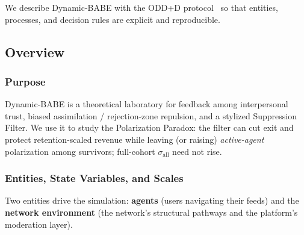 
We describe Dynamic-BABE with the ODD+D protocol~\citep{Grimm2010, Muller2013} so that entities, processes, and decision rules are explicit and reproducible.

\subsection{Overview}

\subsubsection{Purpose}
Dynamic-BABE is a theoretical laboratory for feedback among interpersonal trust, biased assimilation / rejection-zone repulsion, and a stylized Suppression Filter. We use it to study the Polarization Paradox: the filter can cut exit and protect retention-scaled revenue while leaving (or raising) \emph{active-agent} polarization among survivors; full-cohort $\sigma_{\mathrm{all}}$ need not rise.

\subsubsection{Entities, State Variables, and Scales}
Two entities drive the simulation: \textbf{agents} (users navigating their feeds) and the \textbf{network environment} (the network's structural pathways and the platform's moderation layer).

